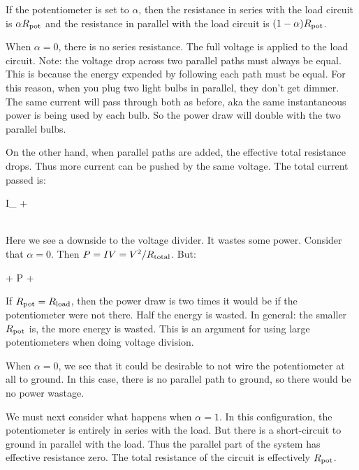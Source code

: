 \documentclass[11pt, oneside]{amsart}
\begin{document}

If the potentiometer is set to $\alpha$, then the resistance in series
with the load circuit is $\alpha R_\text{pot}$ and the resistance in parallel
with the load circuit is $\mathopen{}\left( {1 - \alpha} \right)\mathclose{} R_\text{pot}$.

When $\alpha = 0$, there is no series resistance. The full voltage is
applied to the load circuit. Note: the voltage drop across two parallel
paths must always be equal. This is because the energy expended by
following each path must be equal. For this reason, when you plug two
light bulbs in parallel, they don't get dimmer. The same current will
pass through both as before, aka the same instantaneous power is being
used by each bulb. So the power draw will double with the two parallel
bulbs.

On the other hand, when parallel paths are added, the effective total
resistance drops. Thus more current can be pushed by the same voltage.
The total current passed is:

\begin{nedqn}
  I_
\eqcol
   + 
\\
  \Rtot
\eqcol
\\
\eqcol
\end{nedqn}

\noindent
Here we see a downside to the voltage divider. It wastes some power.
Consider that $\alpha = 0$. Then $P = IV = V^2/R_\text{total}$. But:

\begin{nedqn}
\eqcol
   + 
  P
\eqcol
   + 
\end{nedqn}

If $R_\text{pot} = R_\text{load}$, then the power draw is two times it would be if the
potentiometer were not there. Half the energy is wasted. In general: the
smaller $R_\text{pot}$ is, the more energy is wasted. This is an argument for
using large potentiometers when doing voltage division.

When $\alpha = 0$, we see that it could be desirable to not wire the
potentiometer at all to ground. In this case, there is no parallel path
to ground, so there would be no power wastage.

We must next consider what happens when $\alpha = 1$. In this
configuration, the potentiometer is entirely in series with the load.
But there is a short-circuit to ground in parallel with the load. Thus
the parallel part of the system has effective resistance zero. The total
resistance of the circuit is effectively $R_\text{pot}$.
\end{document}
